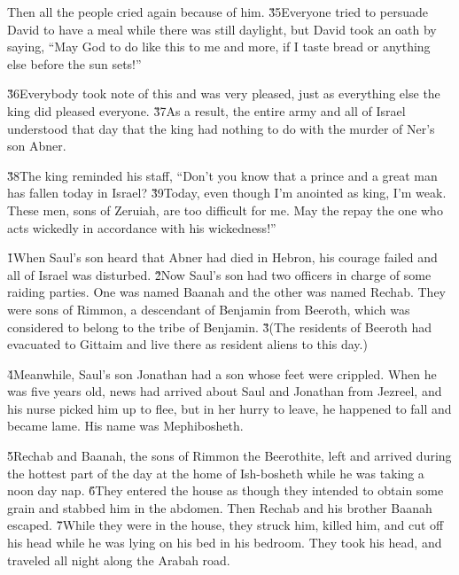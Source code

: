 Then all the people cried again because of him. \v{35}Everyone tried to persuade David to have a meal while there was still daylight, but David took an oath by saying, ``May God to do like this to me and more, if I taste bread or anything else before the sun sets!''

\v{36}Everybody took note of this and was very pleased, just as everything else the king did pleased everyone. \v{37}As a result, the entire army and all of Israel understood that day that the king had nothing to do with the murder of Ner's son Abner.

\v{38}The king reminded his staff, ``Don't you know that a prince and a great man has fallen today in Israel? \v{39}Today, even though I'm anointed as king, I'm weak. These men, sons of Zeruiah, are too difficult for me. May the  repay the one who acts wickedly in accordance with his wickedness!''

\v{1}When Saul's son heard that Abner had died in Hebron, his courage failed and all of Israel was disturbed. \v{2}Now Saul's son had two officers in charge of some raiding parties. One was named Baanah and the other was named Rechab. They were sons of Rimmon, a descendant of Benjamin from Beeroth, which was considered to belong to the tribe of Benjamin. \v{3}(The residents of Beeroth had evacuated to Gittaim and live there as resident aliens to this day.)

\v{4}Meanwhile, Saul's son Jonathan had a son whose feet were crippled. When he was five years old, news had arrived about Saul and Jonathan from Jezreel, and his nurse picked him up to flee, but in her hurry to leave, he happened to fall and became lame. His name was Mephibosheth.

\v{5}Rechab and Baanah, the sons of Rimmon the Beerothite, left and arrived during the hottest part of the day at the home of Ish-bosheth while he was taking a noon day nap. \v{6}They entered the house as though they intended to obtain some grain and stabbed him in the abdomen. Then Rechab and his brother Baanah escaped. \v{7}While they were in the house, they struck him, killed him, and cut off his head while he was lying on his bed in his bedroom. They took his head, and traveled all night along the Arabah road.

